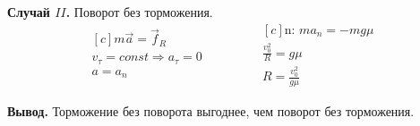 \documentclass[a5paper,10pt]{article}\usepackage[usenames,dvipsnames]{color}\usepackage{extsizes,cmap,graphicx,misccorr,indentfirst,makecell,multirow,ulem,geometry,amssymb,amsfonts,amsmath,amsthm,titlesec,float,fancyhdr,wrapfig,tikz}\usepackage[T2A]{fontenc}\usepackage[utf8x]{inputenc}\usepackage[english, russian]{babel}\usetikzlibrary{decorations.pathreplacing,decorations.pathmorphing,patterns,calc,scopes,arrows,through}\graphicspath{{img/}}\linespread{1.3}\frenchspacing\geometry{left=1cm, right=1cm, top=2cm, bottom=1cm, bindingoffset=0cm}\pagestyle{fancy}\fancyhead{}\fancyhead[R]{Сарафанов Ф.Г.}
\begin{document}
\textbf{Случай $II$.} Поворот без торможения.
\begin{equation*}
    \begin{aligned}[c]
	m\vec{a}=\vec{f}_R\\
	v_\tau=const \Longrightarrow a_\tau=0 \\ a=a_n\\
    \end{aligned}
        \qquad\qquad
    \begin{aligned}[c]
	\text{n: } ma_n=-mg\mu\\
	\frac{v_0^2}{R}=g\mu\\
	R=\frac{v_0^2}{g\mu}
    \end{aligned}
\end{equation*}

\textbf{Вывод.} Торможение без поворота выгоднее, чем поворот без торможения.
\end{document}
